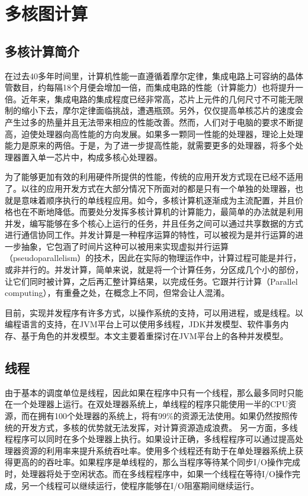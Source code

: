 
\chapter{多核图计算}

\section{多核计算简介}
在过去40多年时间里，计算机性能一直遵循着摩尔定律，集成电路上可容纳的晶体管数目，约每隔18个月便会增加一倍，而集成电路的性能（计算能力）也将提升一倍。近年来，集成电路的集成程度已经非常高，芯片上元件的几何尺寸不可能无限制的缩小下去，摩尔定律面临挑战，遭遇瓶颈。另外，仅仅提高单核芯片的速度会产生过多的热量并且无法带来相应的性能改善。然而，人们对于电脑的要求不断提高，迫使处理器向高性能的方向发展。如果多一颗同一性能的处理器，理论上处理能力是原来的两倍。于是，为了进一步提高性能，就需要更多的处理器，将多个处理器置入单一芯片中，构成多核心处理器。

为了能够更加有效的利用硬件所提供的性能，传统的应用开发方式现在已经不适用了。以往的应用开发方式在大部分情况下所面对的都是只有一个单独的处理器，也就是意味着顺序执行的单线程应用。如今，多核计算机逐渐成为主流配置，并且价格也在不断地降低。而要处分发挥多核计算机的计算能力，最简单的办法就是利用并发，编写能够在多个核心上运行的任务，并且任务之间可以通过共享数据的方式进行通信协同工作。并发计算是一种程序运算的特性，可以被视为是并行运算的进一步抽象，它包涵了时间片这种可以被用来实现虚拟并行运算（pseudoparallelism）的技术，因此在实际的物理运作中，计算过程可能是并行，或非并行的。并发计算，简单来说，就是将一个计算任务，分区成几个小的部份，让它们同时被计算，之后再汇整计算结果，以完成任务。它跟并行计算（Parallel computing），有重叠之处，在概念上不同，但常会让人混淆。

目前，实现并发程序有许多方式，以操作系统的支持，可以用进程，或是线程。以编程语言的支持，在JVM平台上可以使用多线程，JDK并发模型、软件事务内存、基于角色的并发模型。本文主要着重探讨在JVM平台上的各种并发模型。


\section{线程}

由于基本的调度单位是线程，因此如果在程序中只有一个线程，那么最多同时只能在一个处理器上运行。在双处理器系统上，单线程的程序只能使用一半的CPU资源，而在拥有100个处理器的系统上，将有99$\%$的资源无法使用。如果仍然按照传统的开发方式，多核的优势就无法发挥，对计算资源造成浪费。
另一方面，多线程程序可以同时在多个处理器上执行。如果设计正确，多线程程序可以通过提高处理器资源的利用率来提升系统吞吐率。使用多个线程还有助于在单处理器系统上获得更高的的吞吐率。如果程序是单线程的，那么当程序等待某个同步I/O操作完成时，处理器将处于空闲状态。而在多线程程序中，如果一个线程在等待I/O操作完成，另一个线程可以继续运行，使程序能够在I/O阻塞期间继续运行。





